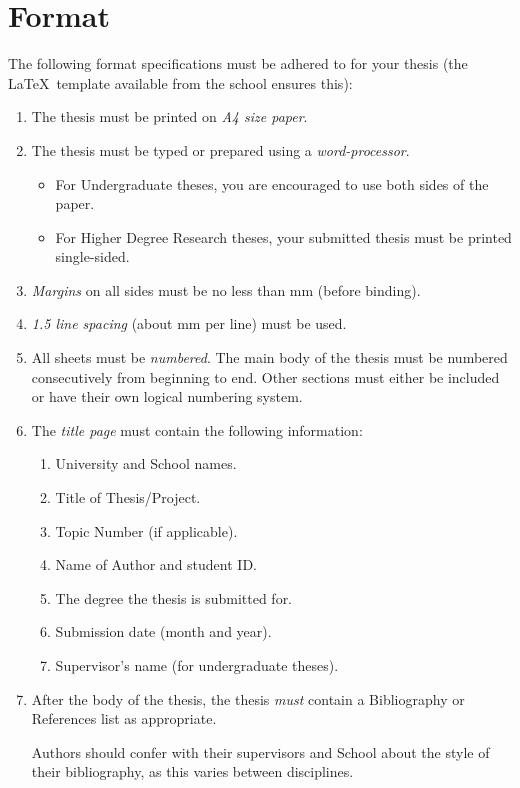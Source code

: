 \section{Format}
The following format specifications must be adhered to for your thesis
(the \LaTeX\ template available from the school ensures this):
\begin{enumerate}
\item The thesis must be printed on \emph{A4 size paper}.
\item The thesis must be typed or prepared using a \emph{word-processor}.
\begin{itemize}
\item For Undergraduate theses, you are encouraged to use both sides
  of the paper.
\item For Higher Degree Research theses, your submitted thesis must be
   printed single-sided.
\end{itemize}
\item \emph{Margins} on all sides must be no less than \unit[25]{mm} (before
binding).
\item \emph{1.5 line spacing} (about \unit[8]{mm} per line) must be used.
\item All sheets must be \emph{numbered}. The main body of the thesis must be
numbered consecutively from beginning to end.  Other sections must either
be included or have their own logical numbering system.
\item The \emph{title page} must contain the following information:
\begin{enumerate}
\item University and School names.
\item Title of Thesis/Project.
\item Topic Number (if applicable).
\item Name of Author and student ID.
\item The degree the thesis is submitted for.
\item Submission date (month and year).
\item Supervisor's name (for undergraduate theses).
\end{enumerate}
\item After the body of the thesis, the thesis \emph{must} contain a
  Bibliography or References list as appropriate.

Authors should confer with their supervisors and School about the
style of their bibliography, as this varies between disciplines.
\end{enumerate}


